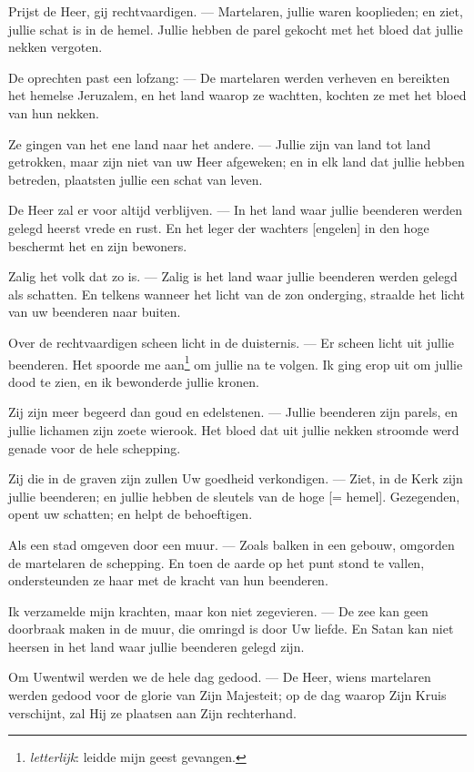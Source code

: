 \documentclass[12pt,twoside,a5paper]{article}
\newlength{\origparskip}
\newenvironment{halfparskip}{
  \setlength{\parskip}{0.5\origparskip}
}{
  \setlength{\parskip}{\origparskip}
}
\begin{document}
\begin{halfparskip}
  Prijst de Heer, gij rechtvaardigen. --- Martelaren, jullie waren kooplieden; en ziet, jullie schat is in de hemel. Jullie hebben de parel gekocht met het bloed dat jullie nekken vergoten.

  De oprechten past een lofzang: --- De martelaren werden verheven en bereikten het hemelse Jeruzalem, en het land waarop ze wachtten, kochten ze met het bloed van hun nekken.

  Ze gingen van het ene land naar het andere. --- Jullie zijn van land tot land getrokken, maar zijn niet van uw Heer afgeweken; en in elk land dat jullie hebben betreden, plaatsten jullie een schat van leven.

  De Heer zal er voor altijd verblijven. --- In het land waar jullie beenderen werden gelegd heerst vrede en rust. En het leger der wachters [engelen] in den hoge beschermt het en zijn bewoners.

  Zalig het volk dat zo is. --- Zalig is het land waar jullie beenderen werden gelegd als schatten. En telkens wanneer het licht van de zon onderging, straalde het licht van uw beenderen naar buiten.

  Over de rechtvaardigen scheen licht in de duisternis. --- Er scheen licht uit jullie beenderen. Het spoorde me aan\footnote{\emph{letterlijk}: leidde mijn geest gevangen.} om jullie na te volgen. Ik ging erop uit om jullie dood te zien, en ik bewonderde jullie kronen.

  Zij zijn meer begeerd dan goud en edelstenen. --- Jullie beenderen zijn parels, en jullie lichamen zijn zoete wierook. Het bloed dat uit jullie nekken stroomde werd genade voor de hele schepping.

  Zij die in de graven zijn zullen Uw goedheid verkondigen. --- Ziet, in de Kerk zijn jullie beenderen; en jullie hebben de sleutels van de hoge [= hemel]. Gezegenden, opent uw schatten; en helpt de behoeftigen.

  Als een stad omgeven door een muur. --- Zoals balken in een gebouw, omgorden de martelaren de schepping. En toen de aarde op het punt stond te vallen, ondersteunden ze haar met de kracht van hun beenderen.

  Ik verzamelde mijn krachten, maar kon niet zegevieren. --- De zee kan geen doorbraak maken in de muur, die omringd is door Uw liefde. En Satan kan niet heersen in het land waar jullie beenderen gelegd zijn.

  Om Uwentwil werden we de hele dag gedood. --- De Heer, wiens martelaren werden gedood voor de glorie van Zijn Majesteit; op de dag waarop Zijn Kruis verschijnt, zal Hij ze plaatsen aan Zijn rechterhand.


\end{halfparskip}
\end{document}
